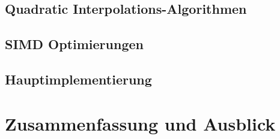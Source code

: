 \documentclass[course=erap]{aspdoc}
\begin{document}
\subsection{Quadratic Interpolations-Algorithmen}

\subsection{SIMD Optimierungen}
\subsection{Hauptimplementierung}

\section{Zusammenfassung und Ausblick}


{}
\end{document}
